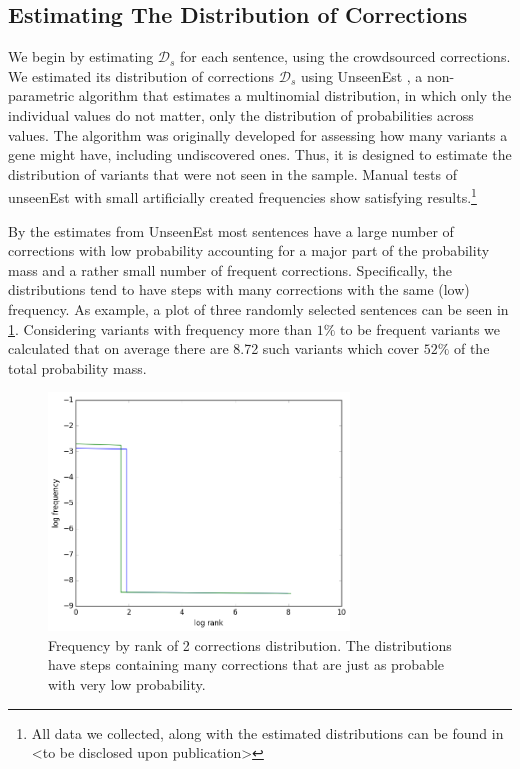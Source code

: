 \documentclass[letter,11pt]{article}
\begin{document}
		\subsection{Estimating The Distribution of Corrections}
		
		We begin by estimating $\mathcal{D}_s$ for each sentence, using the crowdsourced
		corrections. We estimated its distribution of corrections $\mathcal{D}_s$
		using {\sc UnseenEst} \cite{zou2015quantifying}, a non-parametric algorithm that
                estimates a multinomial distribution,
                in which only the individual values do not matter, only the distribution of probabilities
                across values.%
                The algorithm was originally developed for assessing how many
                variants a gene might have, including undiscovered ones.
                Thus, it is designed to estimate the distribution of variants that were not seen in the sample.
                Manual tests of unseenEst with small artificially created frequencies show
		satisfying results.\footnote{All data
		  we collected, along with the estimated distributions can be found in <to be disclosed
		  upon publication>}
		
		By the estimates from {\sc UnseenEst} most sentences have a large number of corrections with low probability accounting for a major part of the probability mass and a rather small number of frequent corrections. Specifically, the distributions tend to have steps with many corrections with the same (low) frequency. As example, a plot of three randomly selected sentences can be seen in \ref{fig:corrections_dist}. Considering variants with frequency more than $1\%$ to be frequent variants we calculated that on average there are 8.72 such variants which cover $52\%$ of the total probability mass.
		
		\begin{figure}
			\includegraphics[width = 8cm]{exact_dists_plot}
			\caption{Frequency by rank of 2 corrections distribution. The distributions have steps containing many corrections that are just as probable with very low probability. 	\label{fig:corrections_dist}}
		\end{figure}
		
\end{document}
